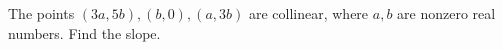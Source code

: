 The points $(3a,5b),(b,0),(a,3b)$ are collinear, where $a,b$ are nonzero real numbers. Find the slope.

